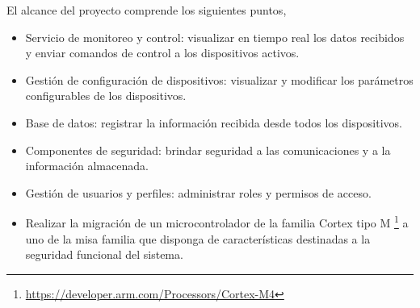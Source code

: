 El alcance del proyecto comprende los siguientes puntos,

\begin{itemize}
	\item Servicio de monitoreo y control: visualizar en tiempo real los datos recibidos y enviar comandos de control a los dispositivos activos. 

    \item Gestión de configuración de dispositivos: visualizar y modificar los parámetros configurables de los dispositivos. 

    \item Base de datos: registrar la información recibida desde todos los dispositivos.

    \item Componentes de seguridad: brindar seguridad a las comunicaciones y a la información almacenada. 

    \item Gestión de usuarios y perfiles: administrar roles y permisos de acceso.

    \item Realizar la migración de un microcontrolador de la familia Cortex tipo M \footnote{\url{https://developer.arm.com/Processors/Cortex-M4}} a uno de la misa familia que disponga de características destinadas a la seguridad funcional del sistema. 
\end{itemize}

